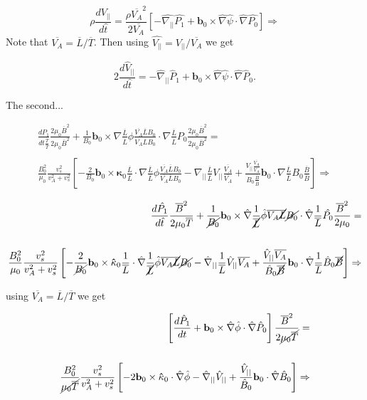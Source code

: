 \documentclass[12pt, a4paper]{article}
\newcommand{\Bbar}{\overline{B}}
\newcommand{\Lbar}{\overline{L}}
\newcommand{\Tbar}{\overline{T}}
\begin{document}
\[
\rho\frac{dV_{||}}{d\hat{t}} =  \frac{\rho\overline{V_A}^2}{2\overline{V_A}}  \left[ -\hat{\nabla_{||}}\hat{P_1} + \mathbf{b}_0\times\hat{\nabla}  \hat{\psi} \cdot \hat{\nabla} \hat{P_0} \right ]   \Rightarrow
\]
Note that $\overline{V_A}=\Lbar/\Tbar$. Then using $\hat{V_{||}}=V_{||}/\overline{V_A}$ we get

\[
2\frac{d\hat{V}_{||}}{d\hat{t}} = - \hat{\nabla}_{||} \hat{P}_1 + \mathbf{b}_0\times\hat{\nabla}\hat{\psi}\cdot\hat{\nabla}\hat{P}_0.
\]

The second...

\begin{eqnarray*}
\frac{dP_1}{dt \frac{\Tbar}{\Tbar}} \frac{2 \mu_0 \Bbar^2}{2 \mu_0 \Bbar^2} + \frac{1}{B_0}\mathbf{b}_0\times\nabla \frac{\Lbar}{\Lbar} \phi\frac{\overline{V_A}\Lbar B_0}{\overline{V_A}\Lbar B_0}\cdot\nabla \frac{\Lbar}{\Lbar} P_0  \frac{2 \mu_0 \Bbar^2}{2 \mu_0 \Bbar^2}= \\\\\frac{B_0^2}{\mu_0}\frac{v_s^2}{v_A^2 + v_s^2}\left[-\frac{2}{B_0}\mathbf{b}_0\times\mathbf{\kappa}_0 \frac{\Lbar}{\Lbar}\cdot\nabla \frac{\Lbar}{\Lbar}\phi \frac{\overline{V_A}\Lbar B_0}{\overline{V_A}\Lbar B_0} - \nabla_{||} \frac{\Lbar}{\Lbar} V_{||} \frac{\overline{V_A}}{\overline{V_A}} + \frac{V_{||}\frac{\overline{V_A}}{\overline{V_A}}}{B_0 \frac{\Bbar}{\Bbar}}\mathbf{b}_0\cdot\nabla \frac{\Lbar}{\Lbar}B_0 \frac{\Bbar}{\Bbar} \right] \Rightarrow
\end{eqnarray*}

\begin{eqnarray*}
\frac{d\hat{P_1}}{d\hat{t}} \frac{\Bbar^2}{2 \mu_0 \Tbar} + \frac{1}{\cancel{B_0}}\mathbf{b}_0\times\hat{\nabla} \frac{1}{\cancel{\Lbar}} \hat{\phi}\overline{V_A}\cancel{\Lbar} \cancel{B_0}\cdot\hat{\nabla} \frac{1}{\Lbar} \hat{P_0}  \frac{\Bbar^2}{2 \mu_0}= \\\\
\frac{B_0^2}{\mu_0}\frac{v_s^2}{v_A^2 + v_s^2}\left[-\frac{2}{\cancel{B_0}}\mathbf{b}_0\times\mathbf{\hat{\kappa}}_0 \frac{1}{\Lbar}\cdot\hat{\nabla} \frac{1}{\cancel{\Lbar}}\hat{\phi} \overline{V_A}\cancel{\Lbar} \cancel{B_0} - \hat{\nabla}_{||} \frac{1}{\Lbar} \hat{V}_{||} \overline{V_A} + \frac{\hat{V}_{||}\overline{V_A}}{\hat{B}_0 \cancel{\Bbar}}\mathbf{b}_0\cdot\hat{\nabla} \frac{1}{\Lbar}\hat{B}_0 \cancel{\Bbar} \right]  \Rightarrow
\end{eqnarray*}

using $\overline{V_A}=\Lbar/\Tbar$ we get 

\begin{eqnarray*}
\left[ \frac{d\hat{P}_1}{dt} + \mathbf{b}_0\times\hat{\nabla}\hat{\phi}\cdot\hat{\nabla}\hat{P}_0 \right] \frac{\Bbar^2}{2 \cancel{\mu_0\Tbar}}= \\\\
\frac{B_0^2}{\cancel{\mu_0\Tbar}} \frac{v_s^2}{v_A^2 + v_s^2}\left[-2\mathbf{b}_0\times\mathbf{\hat{\kappa}}_0\cdot\hat{\nabla}\hat{\phi} - \hat{\nabla}_{||} \hat{V}_{||} + \frac{\hat{V}_{||}}{\hat{B}_0}\mathbf{b}_0\cdot\hat{\nabla} \hat{B}_0\right]\Rightarrow
\end{eqnarray*}
\end{document}

